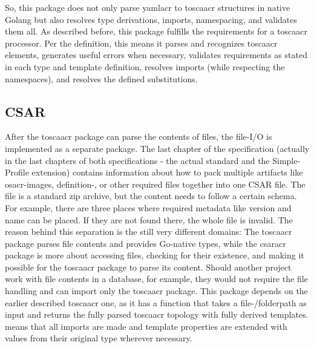 \newline
So, this package does not only parse \gls{yamlacr} to \gls{toscaacr} structures in native Golang but also resolves type derivations, imports, namespacing, and validates them all.
\newline
As described before, this package fulfills the requirements for a \gls{toscaacr} processor. Per the definition, this means it parses and recognizes \gls{toscaacr} elements, generates useful errors when necessary, validates requirements as stated in each type and template definition, resolves imports (while respecting the namespaces), and resolves the defined substitutions.


\subsection{CSAR}
After the \gls{toscaacr} package can parse the contents of files, the file-I/O is implemented as a separate package. The last chapter of the specification (actually in the last chapters of both specifications - the actual standard and the Simple-Profile extension) contains information about how to pack multiple artifacts like \gls{osacr}-images, definition-, or other required files together into one CSAR file. The file is a standard zip archive, but the content needs to follow a certain schema. For example, there are three places where required metadata like version and name can be placed. If they are not found there, the whole file is invalid.
\newline
The reason behind this separation is the still very different domains: The \gls{toscaacr} package parses file contents and provides Go-native types, while the \gls{csaracr} package is more about accessing files, checking for their existence, and making it possible for the \gls{toscaacr} package to parse its content. Should another project work with file contents in a database, for example, they would not require the file handling and can import only the \gls{toscaacr} package.
\newline
This package depends on the earlier described \gls{toscaacr} one, as it has a function that takes a file-/folderpath as input and returns the fully parsed \gls{toscaacr} topology with fully derived templates.  means that all imports are made and template properties are extended with values from their original type wherever necessary.



